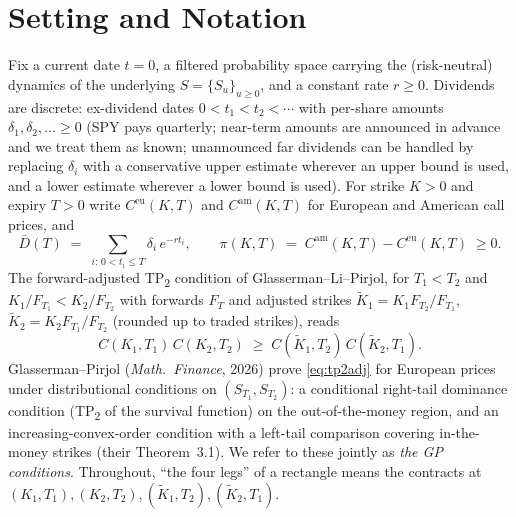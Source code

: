 \documentclass[11pt]{article}
\theoremstyle{remark}
\newcommand{\Cam}{C^{\mathrm{am}}}
\newcommand{\Ceu}{C^{\mathrm{eu}}}
\newcommand{\Kt}[1]{\tilde K_{#1}}
\begin{document}
\section{Setting and Notation}
Fix a current date $t=0$, a filtered probability space carrying the (risk-neutral) dynamics of the underlying $S=\{S_u\}_{u\ge0}$, and a constant rate $r\ge0$. Dividends are discrete: ex-dividend dates $0<t_1<t_2<\cdots$ with per-share amounts $\delta_1,\delta_2,\ldots\ge 0$ (SPY pays quarterly; near-term amounts are announced in advance and we treat them as known; unannounced far dividends can be handled by replacing $\delta_i$ with a conservative upper estimate wherever an upper bound is used, and a lower estimate wherever a lower bound is used). For strike $K>0$ and expiry $T>0$ write $\Ceu(K,T)$ and $\Cam(K,T)$ for European and American call prices, and
\[
\bar D(T)\;=\;\sum_{i:\,0<t_i\le T}\delta_i\,e^{-r t_i},
\qquad
\pi(K,T)\;=\;\Cam(K,T)-\Ceu(K,T)\;\ge0 .
\]
The forward-adjusted TP\textsubscript{2} condition of Glasserman--Li--Pirjol, for $T_1<T_2$ and $K_1/F_{T_1}<K_2/F_{T_2}$ with forwards $F_T$ and adjusted strikes $\Kt1=K_1F_{T_2}/F_{T_1}$, $\Kt2=K_2F_{T_1}/F_{T_2}$ (rounded up to traded strikes), reads
\begin{equation}
C(K_1,T_1)\,C(K_2,T_2)\;\ge\;C(\Kt1,T_2)\,C(\Kt2,T_1).
\label{eq:tp2adj}
\end{equation}
Glasserman--Pirjol (\emph{Math.\ Finance}, 2026) prove \eqref{eq:tp2adj} for European prices under distributional conditions on $(S_{T_1},S_{T_2})$: a conditional right-tail dominance condition (TP\textsubscript{2} of the survival function) on the out-of-the-money region, and an increasing-convex-order condition with a left-tail comparison covering in-the-money strikes (their Theorem~3.1). We refer to these jointly as \emph{the GP conditions}. Throughout, ``the four legs'' of a rectangle means the contracts at $(K_1,T_1),(K_2,T_2),(\Kt1,T_2),(\Kt2,T_1)$.
\end{document}
